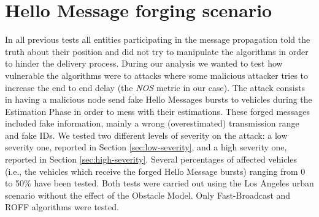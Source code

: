 	\section{Hello Message forging scenario}
		In all previous tests all entities participating in the message propagation told the truth about their position and did not try to manipulate the algorithms in order to hinder the delivery process. During our analysis we wanted to test how vulnerable the algorithms were to attacks where some malicious attacker tries to increase the end to end delay (the \textit{NOS} metric in our case). The attack consists in having a malicious node send fake Hello Messages bursts to vehicles during the Estimation Phase in order to mess with their estimations. These forged messages included fake information, mainly a wrong (overestimated) transmission range and fake IDs. We tested two different levels of severity on the attack: a low severity one, reported in Section \ref{sec:low-severity}, and a high severity one, reported in Section \ref{sec:high-severity}. Several percentages of affected vehicles (i.e., the vehicles which receive the forged Hello Message bursts) ranging from 0 to 50\% have been tested. Both tests were carried out using the Los Angeles urban scenario without the effect of the Obstacle Model. Only Fast-Broadcast and ROFF algorithms were tested.
		
